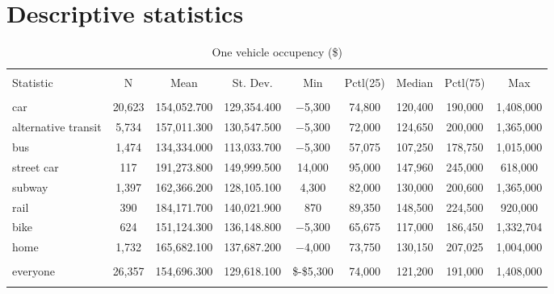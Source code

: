 \documentclass[10pt,a4paper]{article}
\begin{document}
\section*{Descriptive statistics}
\begin{table}[!htbp] \centering 
  \caption{One vehicle occupency (\$)} 
  \label{} 
\begin{tabular}{@{\extracolsep{5pt}}lcccccccc} 
\\[-1.8ex]\hline 
\hline \\[-1.8ex] 
Statistic & \multicolumn{1}{c}{N} & \multicolumn{1}{c}{Mean} & \multicolumn{1}{c}{St. Dev.} & \multicolumn{1}{c}{Min} & \multicolumn{1}{c}{Pctl(25)} & \multicolumn{1}{c}{Median} & \multicolumn{1}{c}{Pctl(75)} & \multicolumn{1}{c}{Max} \\ 
\hline \\[-1.8ex] 
car & 20,623 & 154,052.700 & 129,354.400 & $-$5,300 & 74,800 & 120,400 & 190,000 & 1,408,000 \\ 
alternative transit & 5,734 & 157,011.300 & 130,547.500 & $-$5,300 & 72,000 & 124,650 & 200,000 & 1,365,000 \\ 
bus & 1,474 & 134,334.000 & 113,033.700 & $-$5,300 & 57,075 & 107,250 & 178,750 & 1,015,000 \\ 
street car & 117 & 191,273.800 & 149,999.500 & 14,000 & 95,000 & 147,960 & 245,000 & 618,000 \\ 
subway & 1,397 & 162,366.200 & 128,105.100 & 4,300 & 82,000 & 130,000 & 200,600 & 1,365,000 \\ 
rail & 390 & 184,171.700 & 140,021.900 & 870 & 89,350 & 148,500 & 224,500 & 920,000 \\ 
bike & 624 & 151,124.300 & 136,148.800 & $-$5,300 & 65,675 & 117,000 & 186,450 & 1,332,704 \\ 
home & 1,732 & 165,682.100 & 137,687.200 & $-$4,000 & 73,750 & 130,150 & 207,025 & 1,004,000 \\
\hline \\[-1.8 ex]
everyone & 26,357 & 154,696.300 & 129,618.100 & \$-\$5,300 & 74,000 & 121,200 & 191,000 & 1,408,000 \\
\hline \\[-1.8ex] 
\end{tabular} 
\end{table}
\end{document}
